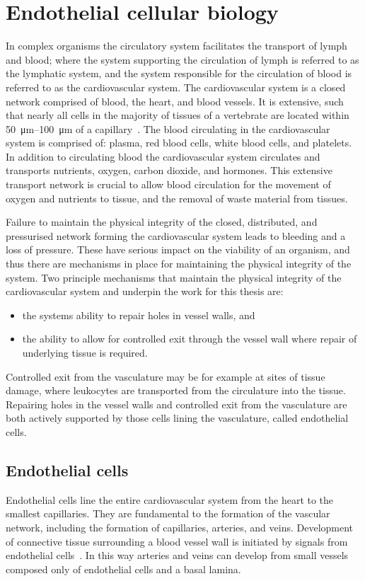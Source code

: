 \section{Endothelial cellular biology}
\label{introduction:endothelial_cellular_biology} 
In complex organisms the circulatory system facilitates the transport of lymph and blood; where the system supporting the circulation of lymph is referred to as the lymphatic system, and the system responsible for the circulation of blood is referred to as the cardiovascular system. The cardiovascular system is a closed network comprised of blood, the heart, and blood vessels. It is extensive, such that nearly all cells in the majority of tissues of a vertebrate are located within \SIrange{50}{100}{\micro\meter} of a capillary~\cite{Alberts2002}. The blood circulating in the cardiovascular system is comprised of: plasma, red blood cells, white blood cells, and platelets. In addition to circulating blood the cardiovascular system circulates and transports nutrients, oxygen, carbon dioxide, and hormones. This extensive transport network is crucial to allow blood circulation for the movement of oxygen and nutrients to tissue, and the removal of waste material from tissues.

Failure to maintain the physical integrity of the closed, distributed, and pressurised network forming the cardiovascular system leads to bleeding and a loss of pressure. These have serious impact on the viability of an organism, and thus there are mechanisms in place for maintaining the physical integrity of the system. Two principle mechanisms that maintain the physical integrity of the cardiovascular system and underpin the work for this thesis are:
\begin{itemize}
    \item the systems ability to repair holes in vessel walls, and
    \item the ability to allow for controlled exit through the vessel wall where repair of underlying tissue is required.
\end{itemize}
Controlled exit from the vasculature may be for example at sites of tissue damage, where leukocytes are transported from the circulature into the tissue. Repairing holes in the vessel walls and controlled exit from the vasculature are both actively supported by those cells lining the vasculature, called endothelial cells.

\subsection{Endothelial cells}
\label{introduction:endothelial_cellular_biology:endothelial_cells}
Endothelial cells line the entire cardiovascular system from the heart to the smallest capillaries. They are fundamental to the formation of the vascular network, including the formation of capillaries, arteries, and veins. Development of connective tissue surrounding a blood vessel wall is initiated by signals from endothelial cells~\cite{Alberts2002}. In this way arteries and veins can develop from small vessels composed only of endothelial cells and a basal lamina.


